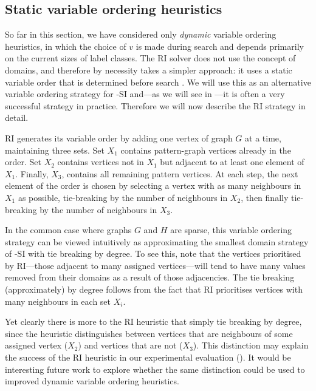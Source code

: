 \subsection{Static variable ordering heuristics}\label{subsec:mcsplit-si-static}

So far in this section, we have considered only \emph{dynamic} variable
ordering heuristics, in which the choice of $v$ is made during search and
depends primarily on the current sizes of label classes.  The RI solver does
not use the concept of domains, and therefore by necessity takes a simpler
approach: it uses a static variable order that is determined before search
\citep{DBLP:journals/tcbb/BonniciG17}.  We will use this as an alternative
variable ordering strategy for \McSplit-SI and---as we will see in
---it is often a very successful strategy in practice.
Therefore we will now describe the RI strategy in detail.

RI generates its variable order by adding one vertex of graph $G$ at a time,
maintaining three sets.  Set $X_1$ contains pattern-graph vertices already in
the order. Set $X_2$ contains vertices not in $X_1$ but adjacent to at least
one element of $X_1$.  Finally, $X_3$, contains all remaining pattern vertices.
At each step, the next element of the order is chosen by selecting a vertex
with as many neighbours in $X_1$ as possible, tie-breaking by the number of
neighbours in $X_2$, then finally tie-breaking by the number of neighbours in
$X_3$.

In the common case where graphs $G$ and $H$ are sparse, this variable
ordering strategy can be viewed intuitively as approximating the smallest
domain strategy of \McSplit-SI with tie breaking by degree.  To see this, note
that the vertices prioritised by RI---those adjacent to many assigned
vertices---will tend to have many values removed from their domains as a result
of those adjacencies.  The tie breaking (approximately) by degree follows from
the fact that RI prioritises vertices with many neighbours in each set $X_i$.

Yet clearly there is more to the RI heuristic that simply tie breaking by
degree, since the heuristic distinguishes between vertices that are neighbours
of some assigned vertex ($X_2$) and vertices that are not ($X_3$). This
distinction may explain the success of the RI heuristic in our experimental
evaluation ().  It would be interesting future work to
explore whether the same distinction could be used to improved dynamic variable
ordering heuristics.

